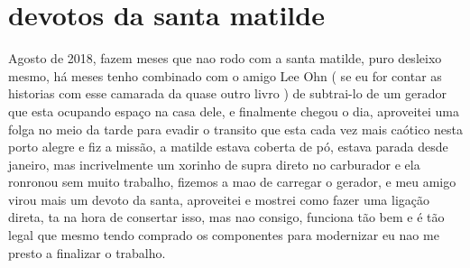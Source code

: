 \documentclass[a4paper]{report}
\begin{document}
\section*{devotos da santa matilde}

Agosto de 2018, fazem meses que nao rodo com a santa matilde, puro desleixo mesmo, h\'a meses tenho combinado com o amigo Lee Ohn ( se eu for contar as historias com esse camarada da quase outro livro ) de subtrai-lo de um gerador que esta ocupando espa\c{c}o na casa dele, e finalmente chegou o dia, aproveitei uma folga no meio da tarde para evadir o transito que esta cada vez mais ca\'otico nesta porto alegre e fiz a miss\~ao, a matilde estava coberta de p\'o, estava parada desde janeiro, mas incrivelmente um xorinho de supra direto no carburador e ela ronronou sem muito trabalho, fizemos a mao de carregar o gerador, e meu amigo virou mais um devoto da santa, aproveitei e mostrei como fazer uma liga\c{c}\~ao direta, ta na hora de consertar isso, mas nao consigo, funciona t\~ao bem e \'e t\~ao legal que mesmo tendo comprado os componentes para modernizar eu nao me presto a finalizar o trabalho. 

\clearpage

\printindex
 
\end{document}
